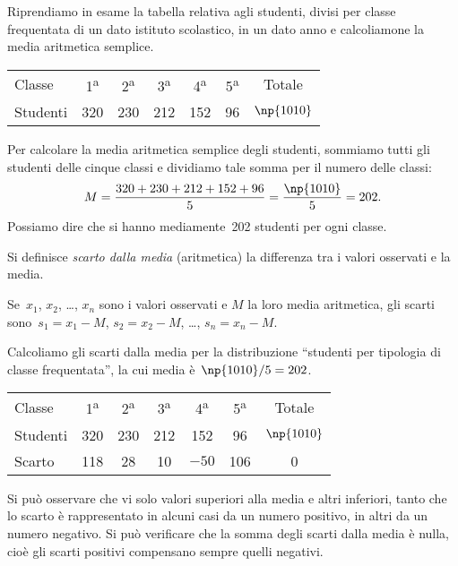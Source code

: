 \begin{exrig}
 \begin{esempio}

Riprendiamo in esame la tabella relativa agli studenti, divisi per classe frequentata di un dato istituto scolastico, in un dato anno e calcoliamone la media aritmetica semplice.
\begin{center}
 \begin{tabular}{lcccccc}
 \toprule
 Classe & 1\textsuperscript{a} & 2\textsuperscript{a} & 3\textsuperscript{a} & 4\textsuperscript{a} & 5\textsuperscript{a} & Totale\\
 Studenti & 320 & 230 & 212 & 152 & 96 & $\np{1010}$\\
 \bottomrule
\end{tabular}
\end{center}
Per calcolare la media aritmetica semplice degli studenti, sommiamo tutti gli studenti delle cinque classi e dividiamo tale somma per il numero delle classi:
\begin{equation*}
M=\frac{320+230+212+152+96}{5}= \frac{\np{1010}}{5}= 202.
\end{equation*}
Possiamo dire che si hanno mediamente~202 studenti per ogni classe.

\begin{definizione}
Si definisce \emph{scarto dalla media} (aritmetica) la differenza tra i valori osservati e la media.
\end{definizione}

Se~$x_1$, $x_2$, \ldots, $x_n$ sono i valori osservati e $M$ la loro media aritmetica, gli scarti sono~$s_1=x_1-M$, $s_2=x_2-M$, \ldots, $s_n=x_n-M$.
\end{esempio}

\begin{esempio}
Calcoliamo gli scarti dalla media per la distribuzione ``studenti per tipologia di classe frequentata'', la cui media è~$\np{1010}/5 = 202$.
\begin{center}
\begin{tabular}{l*{6}{c}}
\toprule
Classe & 1\textsuperscript{a} & 2\textsuperscript{a} & 3\textsuperscript{a} & 4\textsuperscript{a} & 5\textsuperscript{a} & Totale\\
Studenti & 320& 230& 212& 152& 96& $\np{1010}$ \\
Scarto & 118 & 28 & 10 & $-50$ & 106 & 0\\
\bottomrule
\end{tabular}
\end{center}
Si può osservare che vi solo valori superiori alla media e altri inferiori, tanto che lo scarto è rappresentato in
alcuni casi da un numero positivo, in altri da un numero negativo. Si può verificare che la somma degli scarti dalla media è nulla,
cioè gli scarti positivi compensano sempre quelli negativi.
 \end{esempio}
\end{exrig}


